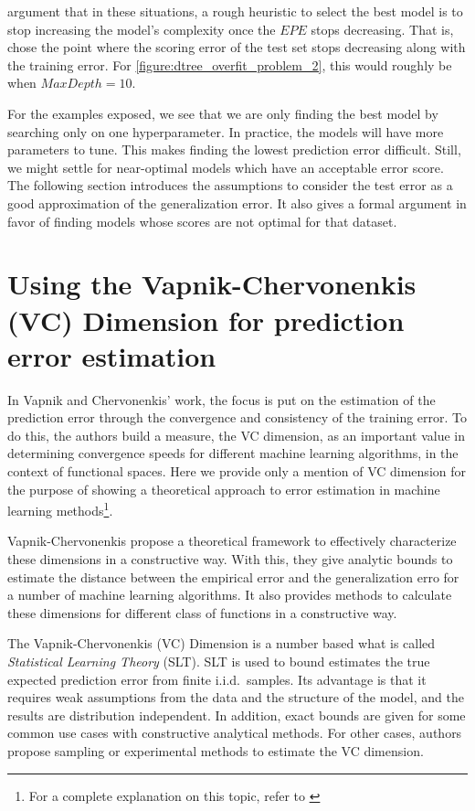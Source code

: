 \protect\textcite{hastie-elemstatslearn} argument that in these situations, a rough heuristic to select the best model is to stop increasing the model's complexity once the $EPE$ stops decreasing.
That is, chose the point where the scoring error of the test set stops decreasing along with the training error.
For \cref{figure:dtree_overfit_problem_2}, this would roughly be when $Max Depth = 10$.

For the examples exposed, we see that we are only finding the best model by searching only on one hyperparameter.
In practice, the models will have more parameters to tune.
This makes finding the lowest prediction error difficult.
Still, we might settle for near-optimal models which have an acceptable error score.
The following section introduces the assumptions to consider the test error as a good approximation of the generalization error.
It also gives a formal argument in favor of finding models whose scores are not optimal for that dataset.


\section{ Using the Vapnik-Chervonenkis (VC) Dimension for prediction error estimation}\label{section-VcDimension}

In Vapnik and Chervonenkis' work, the focus is put on the estimation of the prediction error through the convergence and consistency of the training error. 
To do this, the authors build a measure, the VC dimension, as an important value in determining convergence speeds for different machine learning algorithms, in the context of functional spaces. 
Here we provide only a mention of VC dimension for the purpose of showing a theoretical approach to error estimation in machine learning methods\footnote{For a complete explanation on this topic, refer to \textcite{vapnik-nature2000}}.

Vapnik-Chervonenkis propose a theoretical framework to effectively characterize these dimensions in a constructive way.
With this, they give analytic bounds to estimate the distance between the empirical error and the generalization erro for a number of machine learning algorithms.
It also provides methods to calculate these dimensions for different class of functions in a constructive way.


The Vapnik-Chervonenkis (VC) Dimension is a number based what is called \textit{Statistical Learning Theory} (SLT).
SLT is used to bound estimates the true expected prediction error from finite i.i.d.\ samples. 
Its advantage is that it requires weak assumptions from the data and the structure of the model, and the results are distribution independent. 
In addition, exact bounds are given for some common use cases with constructive analytical methods. 
For other cases, authors propose sampling or experimental methods to estimate the VC dimension. 

